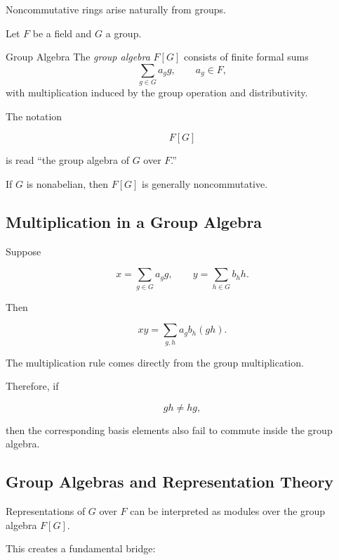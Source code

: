 Noncommutative rings arise naturally from groups.

Let \(F\) be a field and \(G\) a group.

\begin{definitionbox}{Group Algebra}
The \emph{group algebra} \(F[G]\) consists of finite formal sums
\[ \sum_{g\in G}a_g g,\qquad a_g\in F, \]
with multiplication induced by the group operation and distributivity.
\end{definitionbox}

The notation

\[ F[G] \]

is read ``the group algebra of \(G\) over \(F\).''

If \(G\) is nonabelian, then \(F[G]\) is generally noncommutative.

\subsection{Multiplication in a Group Algebra}
\label{subsec:group-algebra-multiplication}

Suppose

\[ x=\sum_{g\in G}a_gg,\qquad y=\sum_{h\in G}b_hh. \]

Then

\[ xy=\sum_{g,h}a_gb_h(gh). \]

The multiplication rule comes directly from the group multiplication.

Therefore, if

\[ gh\neq hg, \]

then the corresponding basis elements also fail to commute inside the group
algebra.

\subsection{Group Algebras and Representation Theory}
\label{subsec:group-algebras-representations}

Representations of \(G\) over \(F\) can be interpreted as modules over the
group algebra \(F[G]\).

This creates a fundamental bridge:

\begin{center}
\end{center}

